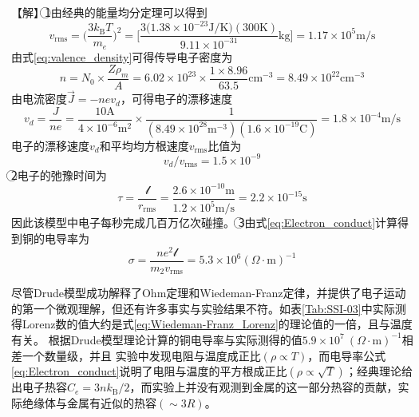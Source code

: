 【解】\textcircled{1}由经典的能量均分定理可以得到
\begin{displaymath}
	v_{\mathrm{rms}}=\bigg(\dfrac{3k_{\mathrm{B}}T}{m_e}\bigg)^2=\bigg[\dfrac{3\big(1.38\times10^{-23}\mathrm{J/K}\big)(300\mathrm{K})}{9.11\times10^{-31}}\mathrm{kg}\bigg]=1.17\times10^5\mathrm{m/s}
\end{displaymath} 
由式\eqref{eq:valence_density}可得传导电子密度为
\begin{displaymath}
	n=N_0\times\dfrac{Z\rho_m}{A}=6.02\times10^{23}\times\dfrac{1\times8.96}{63.5}\mathrm{cm}^{-3}=8.49\times10^{22}\mathrm{cm}^{-3}
\end{displaymath} 
由电流密度$\vec J=-nev_d$，可得电子的漂移速度
\begin{displaymath}
	v_d=\dfrac{J}{ne}=\dfrac{10\mathrm{A}}{4\times10^{-6}\mathrm{m}^2}\times\dfrac1{(8.49\times10^{28}\mathrm{m}^{-3})(1.6\times10^{-19}\mathrm{C})}=1.8\times10^{-4}\mathrm{m/s}
\end{displaymath} 
电子的漂移速度$v_d$和平均均方根速度$v_{\mathrm{rms}}$比值为
\begin{displaymath}
	v_d/v_{\mathrm{rms}}=1.5\times10^{-9}
\end{displaymath}
\textcircled{2}电子的弛豫时间为
\begin{displaymath}
	\tau=\dfrac{\mathscr{l}}{r_{\mathrm{rms}}}=\dfrac{2.6\times10^{-10}\mathrm{m}}{1.2\times10^5\mathrm{m/s}}=2.2\times10^{-15}\mathrm{s}
\end{displaymath}
因此该模型中电子每秒完成几百万亿次碰撞。
\textcircled{3}由式\eqref{eq:Electron_conduct}计算得到铜的电导率为
\begin{displaymath}
	\sigma=\dfrac{ne^2\mathscr{l}}{m_2v_{\mathrm{rms}}}=5.3\times10^6(\Omega\cdot\mathrm{m})^{-1}
\end{displaymath} 

尽管Drude模型成功解释了Ohm定理和Wiedeman-Franz定律，并提供了电子运动的第一个微观理解，但还有许多事实与实验结果不符。如表\ref{Tab:SSI-03}中实际测得Lorenz数的值大约是式\eqref{eq:Wiedeman-Franz_Lorenz}的理论值的一倍，且与温度有关。%
根据Drude模型理论计算的铜电导率与实际测得的值$5.9\times10^7~(\Omega\cdot\mathrm{m})^{-1}$相差一个数量级，并且
实验中发现电阻与温度成正比$(\rho\propto T)$，而电导率公式\eqref{eq:Electron_conduct}说明了电阻与温度的平方根成正比$(\rho\propto\sqrt{T})$；经典理论给出电子热容$C_e=3nk_{\mathrm{B}}/2$，而实验上并没有观测到金属的这一部分热容的贡献，实际绝缘体与金属有近似的热容$(\sim3R)$。
